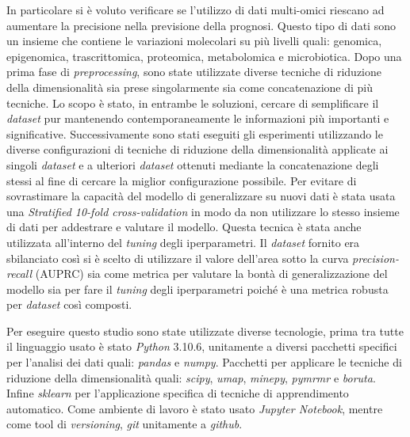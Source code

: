 \documentclass[12pt]{article}
\begin{document}
	In particolare si è voluto verificare se l'utilizzo di dati multi-omici \cite{Hasin2017} riescano ad aumentare la precisione nella previsione della prognosi. Questo tipo di dati sono un insieme che contiene le variazioni molecolari su più livelli quali: genomica, epigenomica, trascrittomica, proteomica, metabolomica e microbiotica. Dopo una prima fase di \textit{preprocessing}, sono state utilizzate diverse tecniche di riduzione della dimensionalità sia prese singolarmente sia come concatenazione di più tecniche. Lo scopo è stato, in entrambe le soluzioni, cercare di semplificare il \textit{dataset} pur mantenendo contemporaneamente le informazioni più importanti e significative. Successivamente sono stati eseguiti gli esperimenti utilizzando le diverse configurazioni di tecniche di riduzione della dimensionalità applicate ai singoli \textit{dataset} e a ulteriori \textit{dataset} ottenuti mediante la concatenazione degli stessi al fine di cercare la miglior configurazione possibile.
	Per evitare di sovrastimare la capacità del modello di generalizzare su nuovi dati è stata usata una \textit{Stratified 10-fold cross-validation} in modo da non utilizzare lo stesso insieme di dati per addestrare e valutare il modello. Questa tecnica è stata anche utilizzata all'interno del \textit{tuning} degli iperparametri.
	Il \textit{dataset} fornito era sbilanciato così si è scelto di utilizzare il valore dell'area sotto la curva \textit{precision-recall} (AUPRC) sia come metrica per valutare la bontà di generalizzazione del modello sia per fare il \textit{tuning} degli iperparametri poiché è una metrica robusta per \textit{dataset} così composti.
	
	Per eseguire questo studio sono state utilizzate diverse tecnologie, prima tra tutte il linguaggio usato è stato \textit{Python} 3.10.6, unitamente a diversi pacchetti specifici per l'analisi dei dati quali: \textit{pandas} e \textit{numpy}. Pacchetti per applicare le tecniche di riduzione della dimensionalità quali: \textit{scipy}, \textit{umap}, \textit{minepy}, \textit{pymrmr} e \textit{boruta}. Infine \textit{sklearn} per l'applicazione specifica di tecniche di apprendimento automatico.
	Come ambiente di lavoro è stato usato \textit{Jupyter Notebook}, mentre come tool di \textit{versioning}, \textit{git} unitamente a \textit{github}. 
	 
\end{document}
